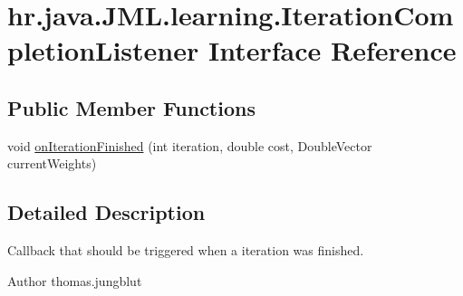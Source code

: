 \hypertarget{interfacehr_1_1java_1_1_j_m_l_1_1learning_1_1_iteration_completion_listener}{\section{hr.\+java.\+J\+M\+L.\+learning.\+Iteration\+Completion\+Listener Interface Reference}
\label{interfacehr_1_1java_1_1_j_m_l_1_1learning_1_1_iteration_completion_listener}
}
\subsection*{Public Member Functions}
\begin{DoxyCompactItemize}
\item 
void \hyperlink{interfacehr_1_1java_1_1_j_m_l_1_1learning_1_1_iteration_completion_listener_a5f96219cfb1c5a863f6211deb8988e86}{on\+Iteration\+Finished} (int iteration, double cost, Double\+Vector current\+Weights)
\end{DoxyCompactItemize}


\subsection{Detailed Description}
Callback that should be triggered when a iteration was finished.

\begin{DoxyAuthor}{Author}
thomas.\+jungblut 
\end{DoxyAuthor}


